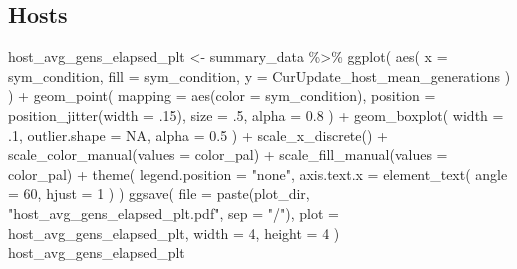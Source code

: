 \documentclass[
]{book}
\newenvironment{Shaded}{\begin{snugshade}}{\end{snugshade}}
\newcommand{\AttributeTok}[1]{\textcolor[rgb]{0.77,0.63,0.00}{#1}}
\newcommand{\ConstantTok}[1]{\textcolor[rgb]{0.00,0.00,0.00}{#1}}
\newcommand{\DecValTok}[1]{\textcolor[rgb]{0.00,0.00,0.81}{#1}}
\newcommand{\FloatTok}[1]{\textcolor[rgb]{0.00,0.00,0.81}{#1}}
\newcommand{\FunctionTok}[1]{\textcolor[rgb]{0.00,0.00,0.00}{#1}}
\newcommand{\NormalTok}[1]{#1}
\newcommand{\OtherTok}[1]{\textcolor[rgb]{0.56,0.35,0.01}{#1}}
\newcommand{\SpecialCharTok}[1]{\textcolor[rgb]{0.00,0.00,0.00}{#1}}
\newcommand{\StringTok}[1]{\textcolor[rgb]{0.31,0.60,0.02}{#1}}
\begin{document}
\hypertarget{hosts-1}{%
\subsection{Hosts}\label{hosts-1}}

\begin{Shaded}
\begin{Highlighting}[]
\NormalTok{host\_avg\_gens\_elapsed\_plt }\OtherTok{\textless{}{-}}\NormalTok{ summary\_data }\SpecialCharTok{\%\textgreater{}\%}
  \FunctionTok{ggplot}\NormalTok{(}
    \FunctionTok{aes}\NormalTok{(}
      \AttributeTok{x =}\NormalTok{ sym\_condition,}
      \AttributeTok{fill =}\NormalTok{ sym\_condition,}
      \AttributeTok{y =}\NormalTok{ CurUpdate\_host\_mean\_generations}
\NormalTok{    )}
\NormalTok{  ) }\SpecialCharTok{+}
  \FunctionTok{geom\_point}\NormalTok{(}
    \AttributeTok{mapping =} \FunctionTok{aes}\NormalTok{(}\AttributeTok{color =}\NormalTok{ sym\_condition),}
    \AttributeTok{position =} \FunctionTok{position\_jitter}\NormalTok{(}\AttributeTok{width =}\NormalTok{ .}\DecValTok{15}\NormalTok{),}
    \AttributeTok{size =}\NormalTok{ .}\DecValTok{5}\NormalTok{,}
    \AttributeTok{alpha =} \FloatTok{0.8}
\NormalTok{  ) }\SpecialCharTok{+}
  \FunctionTok{geom\_boxplot}\NormalTok{(}
    \AttributeTok{width =}\NormalTok{ .}\DecValTok{1}\NormalTok{,}
    \AttributeTok{outlier.shape =} \ConstantTok{NA}\NormalTok{,}
    \AttributeTok{alpha =} \FloatTok{0.5}
\NormalTok{  ) }\SpecialCharTok{+}
  \FunctionTok{scale\_x\_discrete}\NormalTok{() }\SpecialCharTok{+}
  \FunctionTok{scale\_color\_manual}\NormalTok{(}\AttributeTok{values =}\NormalTok{ color\_pal) }\SpecialCharTok{+}
  \FunctionTok{scale\_fill\_manual}\NormalTok{(}\AttributeTok{values =}\NormalTok{ color\_pal) }\SpecialCharTok{+}
  \FunctionTok{theme}\NormalTok{(}
    \AttributeTok{legend.position =} \StringTok{"none"}\NormalTok{,}
    \AttributeTok{axis.text.x =} \FunctionTok{element\_text}\NormalTok{(}
      \AttributeTok{angle =} \DecValTok{60}\NormalTok{,}
      \AttributeTok{hjust =} \DecValTok{1}
\NormalTok{    )}
\NormalTok{  )}
\FunctionTok{ggsave}\NormalTok{(}
  \AttributeTok{file =} \FunctionTok{paste}\NormalTok{(plot\_dir, }\StringTok{"host\_avg\_gens\_elapsed\_plt.pdf"}\NormalTok{, }\AttributeTok{sep =} \StringTok{"/"}\NormalTok{),}
  \AttributeTok{plot =}\NormalTok{ host\_avg\_gens\_elapsed\_plt,}
  \AttributeTok{width =} \DecValTok{4}\NormalTok{,}
  \AttributeTok{height =} \DecValTok{4}
\NormalTok{)}
\NormalTok{host\_avg\_gens\_elapsed\_plt}
\end{Highlighting}
\end{Shaded}
\end{document}
